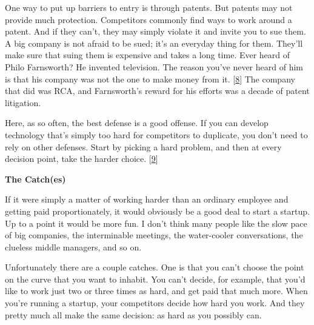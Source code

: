 One way to put up barriers to entry is
                    through patents. But patents may not provide much
                    protection. Competitors commonly find ways to work around a
                    patent. And if they can't, they may simply violate it and
                    invite you to sue them. A big company is not afraid to be
                    sued; it's an everyday thing for them. They'll make sure
                    that suing them is expensive and takes a long time. Ever
                    heard of Philo Farnsworth? He invented television. The
                    reason you've never heard of him is that his company was not
                    the one to make money from it.
                    [\href{\#f8n}{8}]
                    The company that did was RCA, and Farnsworth's reward for
                    his efforts was a decade of patent litigation.

Here,
                    as so often, the best defense is a good offense. If you can
                    develop technology that's simply too hard for competitors to
                    duplicate, you don't need to rely on other defenses. Start
                    by picking a hard problem, and then at every decision point,
                    take the harder choice.
                    [\href{\#f9n}{9}]

\textbf{The Catch(es)}

If it were
                    simply a matter of working harder than an ordinary employee
                    and getting paid proportionately, it would obviously be a
                    good deal to start a startup. Up to a point it would be more
                    fun. I don't think many people like the slow pace of big
                    companies, the interminable meetings, the water-cooler
                    conversations, the clueless middle managers, and so on.

Unfortunately
                    there are a couple catches. One is that you can't choose the
                    point on the curve that you want to inhabit. You can't
                    decide, for example, that you'd like to work just two or
                    three times as hard, and get paid that much more. When
                    you're running a startup, your competitors decide how hard
                    you work. And they pretty much all make the same decision:
                    as hard as you possibly can.

